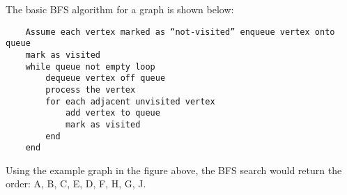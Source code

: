 The basic BFS algorithm for a graph is shown below:
\begin{verbatim}
    Assume each vertex marked as “not-visited” enqueue vertex onto queue
    mark as visited
    while queue not empty loop
        dequeue vertex off queue
        process the vertex
        for each adjacent unvisited vertex
            add vertex to queue
            mark as visited
        end
    end
\end{verbatim}

Using the example graph in the figure above, the BFS search would return the order: A, B, C, E, D, F, H, G, J.